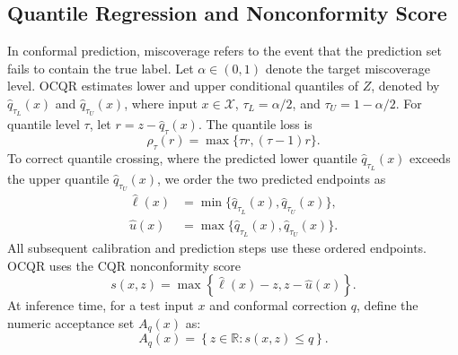 \documentclass[conference]{IEEEtran}
\begin{document}
\subsection{Quantile Regression and Nonconformity Score} \label{subsec:quantile_model}
In conformal prediction, miscoverage refers to the event that the prediction set fails to contain the true label. Let \(\alpha\in(0,1)\) denote the target miscoverage level. OCQR estimates lower and upper conditional quantiles of \(Z\), denoted by \(\widehat q_{\tau_L}(x)\) and \(\widehat q_{\tau_U}(x)\), where input \(x\in\mathcal{X}\),  \(\tau_L=\alpha/2\), and \(\tau_U=1-\alpha/2\).  For quantile level \(\tau\), let \(r=z-\widehat q_{\tau}(x)\). The quantile loss is
\begin{equation}
\rho_{\tau}(r)
=
\max\{\tau r, (\tau-1)r\}.
\label{eq:quantile_loss}
\end{equation}
To correct quantile crossing, where the predicted lower quantile  \(\widehat q_{\tau_L}(x)\) exceeds the upper quantile \(\widehat q_{\tau_U}(x)\), we order the two predicted endpoints as 
\begin{equation}
\begin{aligned}
\widehat\ell(x)
&=
\min\{\widehat q_{\tau_L}(x),\widehat q_{\tau_U}(x)\},\\
\widehat u(x)
&=
\max\{\widehat q_{\tau_L}(x),\widehat q_{\tau_U}(x)\}.
\end{aligned}
\label{eq:ordered_endpoints}
\end{equation}
All subsequent calibration and prediction steps use these ordered endpoints. OCQR uses the CQR nonconformity score
\begin{equation}
s(x,z) =
\max\left\{\widehat\ell(x)-z, z-\widehat u(x)\right\}.
\label{eq:cqr_score}
\end{equation}
At inference time, for a test input \(x\) and conformal correction \(q\), define the numeric acceptance set $A_q(x)$ as:
\begin{equation}
A_q(x) =
\left\{
z\in\mathbb{R}: s(x,z)\le q
\right\}.
\label{eq:acceptance_set}
\end{equation}
\end{document}
